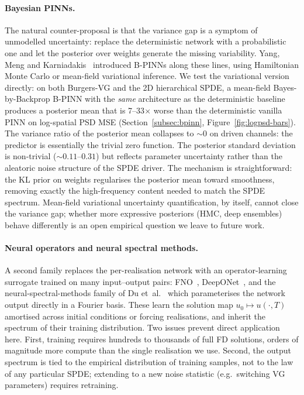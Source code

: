 \documentclass[review,12pt]{elsarticle}
\begin{document}
\paragraph{Bayesian PINNs.}
The natural counter-proposal is that the variance gap is a symptom of
unmodelled uncertainty: replace the deterministic network with a
probabilistic one and let the posterior over weights generate the
missing variability. Yang, Meng and
Karniadakis~\cite{YangMengKarniadakis2021} introduced B-PINNs along
these lines, using Hamiltonian Monte Carlo or mean-field variational
inference. We test the variational version directly: on both
Burgers-VG and the 2D hierarchical SPDE, a mean-field
Bayes-by-Backprop B-PINN with the \emph{same} architecture as the
deterministic baseline produces a posterior mean that is
7--33\(\times\) worse than the deterministic vanilla PINN on
log-spatial PSD MSE (Section~\ref{subsec:bpinn},
Figure~\ref{fig:logpsd-bars}). The variance ratio of the posterior
mean collapses to \(\sim 0\) on driven channels: the predictor is
essentially the trivial zero function. The posterior standard
deviation is non-trivial (\(\sim 0.11\)--\(0.31\)) but reflects
parameter uncertainty rather than the aleatoric noise structure of
the SPDE driver. The mechanism is straightforward: the KL prior
on weights regularises the posterior mean toward smoothness,
removing exactly the high-frequency content needed to match the SPDE
spectrum. Mean-field variational uncertainty quantification, by
itself, cannot close the variance gap; whether more expressive
posteriors (HMC, deep ensembles) behave differently is an open
empirical question we leave to future work.

\paragraph{Neural operators and neural spectral methods.}
A second family replaces the per-realisation network with an
operator-learning surrogate trained on many input--output pairs:
FNO~\cite{Li2021FNO}, DeepONet~\cite{Lu2021DeepONet}, and the
neural-spectral-methods family of Du et~al.~\cite{DuEtAl2024NSM}
which parameterises the network output directly in a Fourier basis.
These learn the solution map \(u_0 \mapsto u(\cdot, T)\) amortised
across initial conditions or forcing realisations, and inherit the
spectrum of their training distribution. Two issues prevent direct
application here. First, training requires hundreds to thousands of
full FD solutions, orders of magnitude more compute than the
single realisation we use. Second, the output spectrum is tied to
the empirical distribution of training samples, not to the law of
any particular SPDE; extending to a new noise statistic (e.g.\
switching VG parameters) requires retraining.
\end{document}
